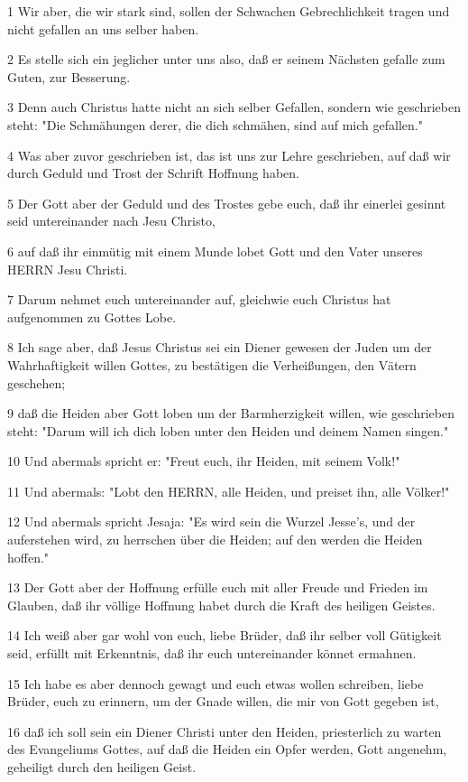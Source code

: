 \par 1 Wir aber, die wir stark sind, sollen der Schwachen Gebrechlichkeit tragen und nicht gefallen an uns selber haben.
\par 2 Es stelle sich ein jeglicher unter uns also, daß er seinem Nächsten gefalle zum Guten, zur Besserung.
\par 3 Denn auch Christus hatte nicht an sich selber Gefallen, sondern wie geschrieben steht: "Die Schmähungen derer, die dich schmähen, sind auf mich gefallen."
\par 4 Was aber zuvor geschrieben ist, das ist uns zur Lehre geschrieben, auf daß wir durch Geduld und Trost der Schrift Hoffnung haben.
\par 5 Der Gott aber der Geduld und des Trostes gebe euch, daß ihr einerlei gesinnt seid untereinander nach Jesu Christo,
\par 6 auf daß ihr einmütig mit einem Munde lobet Gott und den Vater unseres HERRN Jesu Christi.
\par 7 Darum nehmet euch untereinander auf, gleichwie euch Christus hat aufgenommen zu Gottes Lobe.
\par 8 Ich sage aber, daß Jesus Christus sei ein Diener gewesen der Juden um der Wahrhaftigkeit willen Gottes, zu bestätigen die Verheißungen, den Vätern geschehen;
\par 9 daß die Heiden aber Gott loben um der Barmherzigkeit willen, wie geschrieben steht: "Darum will ich dich loben unter den Heiden und deinem Namen singen."
\par 10 Und abermals spricht er: "Freut euch, ihr Heiden, mit seinem Volk!"
\par 11 Und abermals: "Lobt den HERRN, alle Heiden, und preiset ihn, alle Völker!"
\par 12 Und abermals spricht Jesaja: "Es wird sein die Wurzel Jesse's, und der auferstehen wird, zu herrschen über die Heiden; auf den werden die Heiden hoffen."
\par 13 Der Gott aber der Hoffnung erfülle euch mit aller Freude und Frieden im Glauben, daß ihr völlige Hoffnung habet durch die Kraft des heiligen Geistes.
\par 14 Ich weiß aber gar wohl von euch, liebe Brüder, daß ihr selber voll Gütigkeit seid, erfüllt mit Erkenntnis, daß ihr euch untereinander könnet ermahnen.
\par 15 Ich habe es aber dennoch gewagt und euch etwas wollen schreiben, liebe Brüder, euch zu erinnern, um der Gnade willen, die mir von Gott gegeben ist,
\par 16 daß ich soll sein ein Diener Christi unter den Heiden, priesterlich zu warten des Evangeliums Gottes, auf daß die Heiden ein Opfer werden, Gott angenehm, geheiligt durch den heiligen Geist.
